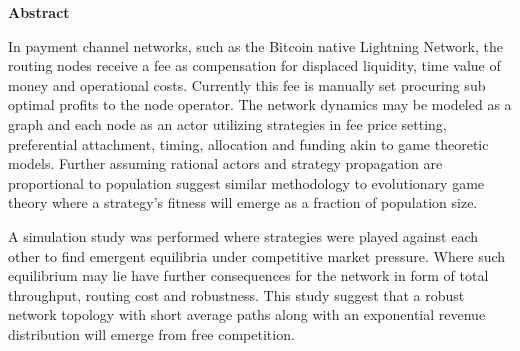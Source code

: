 \begin{center}
	\textbf{Abstract}
\end{center} 

In payment channel networks, such as the Bitcoin native Lightning Network, the routing nodes receive a fee as compensation for displaced liquidity, time value of money and operational costs. Currently this fee is manually set procuring sub optimal profits to the node operator. The network dynamics may be modeled as a graph and each node as an actor utilizing strategies in fee price setting, preferential attachment, timing, allocation and funding akin to game theoretic models. Further assuming rational actors and strategy propagation are proportional to population suggest similar methodology to evolutionary game theory where a strategy's fitness will emerge as a fraction of population size. 

A simulation study was performed where strategies were played against each other to find emergent equilibria under competitive market pressure. Where such equilibrium may lie have further consequences for the network in form of total throughput, routing cost and robustness. This study suggest that a robust network topology with short average paths along with an exponential revenue distribution will emerge from free competition.

